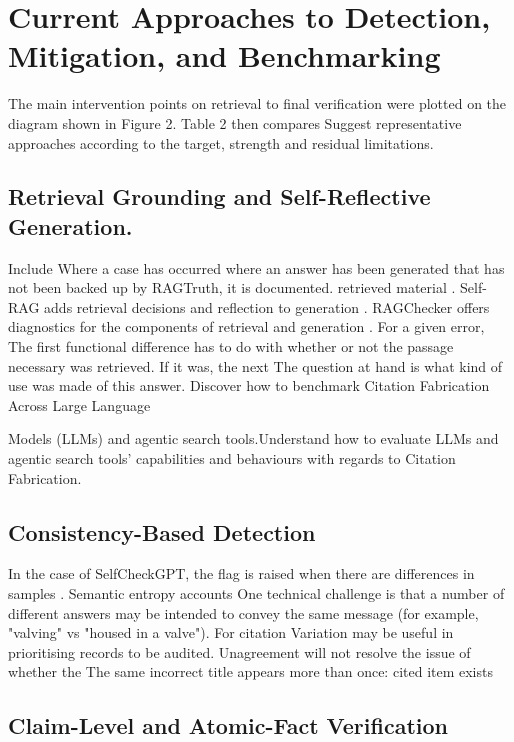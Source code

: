 \documentclass[acmsmall,screen,nonacm]{acmart}
\begin{document}
\section{Current Approaches to Detection, Mitigation, and Benchmarking}

The main intervention points on retrieval to final verification were plotted on the diagram shown in Figure 2. Table 2 then compares Suggest representative approaches according to the target, strength and residual limitations.

\subsection{Retrieval Grounding and Self-Reflective Generation.}

Include Where a case has occurred where an answer has been generated that has not been backed up by RAGTruth, it is documented. retrieved material \cite{ref19}. Self-RAG adds retrieval decisions and reflection to generation \cite{ref1}. RAGChecker offers diagnostics for the components of retrieval and generation \cite{ref21}. For a given error, The first functional difference has to do with whether or not the passage necessary was retrieved. If it was, the next The question at hand is what kind of use was made of this answer. Discover how to benchmark Citation Fabrication Across Large Language

Models (LLMs) and agentic search tools.Understand how to evaluate LLMs and agentic search tools’ capabilities and behaviours with regards to Citation Fabrication.

\subsection{Consistency-Based Detection}

In the case of SelfCheckGPT, the flag is raised when there are differences in samples \cite{ref15}. Semantic entropy accounts One technical challenge is that a number of different answers may be intended to convey the same message (for example, "valving" vs "housed in a valve"). For citation Variation may be useful in prioritising records to be audited. Unagreement will not resolve the issue of whether the The same incorrect title appears more than once: cited item exists

\subsection{Claim-Level and Atomic-Fact Verification}
\end{document}
